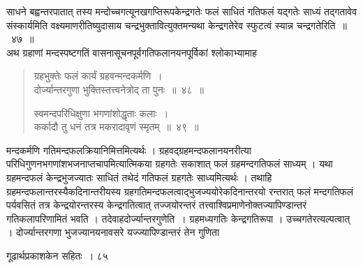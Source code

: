 \documentclass[11pt, openany]{book}
\begin{document}
\begin{sloppypar}
\noindent साधने बह्वन्तरपातात् तस्य मन्दोच्चगत्यूनखगप्तिरूपकेन्द्रगतेः फलं साधितं गतिफलं यद्गतेः साध्यं तद्गतावेव संस्कार्यमिति वक्ष्यमाणरीतिष्युदासाय चन्द्रभुक्तावित्युक्तमन्यथा केन्द्रगतेरेव स्फुटत्वं स्यान्न चन्द्रगतेरिति~॥~४७~॥\\
\noindent अथ ग्रहाणां मन्दस्पष्टगतिं वासनासूचनपूर्वगतिफलानयनपूर्विकां श्लोकाभ्यामाह\textendash
\end{sloppypar}
\begin{quote}

{\ssi ग्रहभुक्तेः फलं कार्यं ग्रहवन्मन्दकर्मणि~।\\
दोर्ज्यान्तरगुणा भुक्तिस्तत्त्वनेत्रोद् ता पुनः~॥~४८~॥

स्वमन्दपरिधिक्षुणा भगणांशोद्धृताः कलाः~।\\
कर्कादौ तु धनं तत्र मकरादावृणं स्मृतम्~॥~४९~॥}
\end{quote}
\begin{sloppypar}
मन्दकर्मणि गतिमन्दफलक्रियानिमित्तमित्यर्थः । ग्रहवद्ग्रहमन्दफलानयनरीत्या परिधिगुणनभगणांशभजनाप्तचापमित्यात्मिकया ग्रहगतेः सकाशात् फलं ग्रहमन्दगतिफलं साध्यम् । यथा ग्रहमन्दफलं केन्द्रभुजज्यातः साधितं तथेदं गतिफलं ग्रहगतेः साध्यमित्यर्थः । तथाहि ग्रहमन्दफलान्तरस्यैकदिनान्तरीयस्य ग्रहगतिमन्दफलत्वाद्भुजज्ययोरेकदिनान्तरयो रन्तरात् फलं मन्दगतिफलं पर्यवसितं तत्र केन्द्रयोरन्तरस्य केन्द्रगतित्वात् तज्जयोरन्तरं तत्त्वाश्विप्रमाणेनोक्तज्यापिण्डान्तरं गतिकलापरिणामितं भवति । तदेवाह\textendash दोर्ज्यान्तरगुणेति~। ग्रहमध्यगतिः केन्द्रगतिरूपा । उच्चगतेरत्यल्पत्वात् । दोर्ज्यान्तरगणा भुजज्यानयनावसरे यज्ज्यापिण्डान्तरं तेन गुणिता
\end{sloppypar}

\newpage



\hspace{3cm} गूढार्थप्रकाशकेन सहितः~। \hfill ८५
\vspace{1cm}
\end{document}
